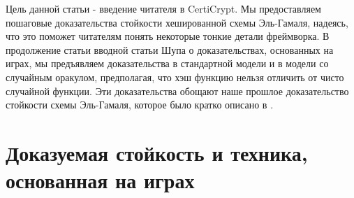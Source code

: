 \documentclass[a4paper,12pt]{report}
\begin{document}
\par
Цель данной статьи - введение читателя в CertiCrypt. Мы предоставляем пошаговые доказательства стойкости хешированной схемы Эль-Гамаля, надеясь, что это поможет читателям понять некоторые тонкие детали фреймворка. В продолжение статьи вводной статьи Шупа о доказательствах, основанных на играх, мы предъявляем доказательства в стандартной модели и в модели со случайным оракулом, предполагая, что хэш функцию нельзя отличить от чисто случайной функции. Эти доказательства обощают наше прошлое доказательство стойкости схемы Эль-Гамаля, которое было кратко описано в \cite{1}.

\chapter{Доказуемая стойкость и техника, основанная на играх}
\end{document}
